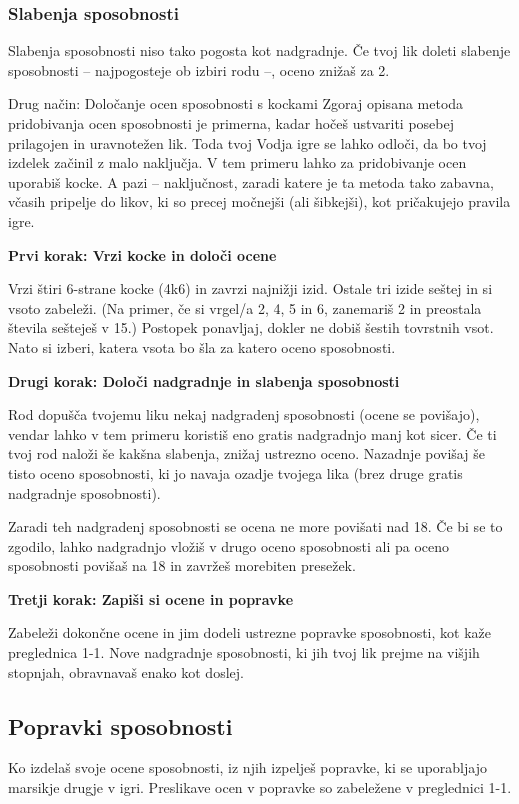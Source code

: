 \subsubsection{Slabenja sposobnosti}
Slabenja sposobnosti niso tako pogosta kot nadgradnje. Če tvoj lik doleti slabenje sposobnosti -- najpogosteje ob izbiri rodu --, oceno znižaš za 2.

\begin{rpg-titlebox}{Drug način: Določanje ocen sposobnosti s kockami}
    Zgoraj opisana metoda pridobivanja ocen sposobnosti je primerna, kadar hočeš ustvariti posebej prilagojen in uravnotežen lik. Toda tvoj Vodja igre se lahko odloči, da bo tvoj izdelek začinil z malo naključja. V tem primeru lahko za pridobivanje ocen uporabiš kocke. A pazi -- naključnost, zaradi katere je ta metoda tako zabavna, včasih pripelje do likov, ki so precej močnejši (ali šibkejši), kot pričakujejo pravila igre.

    \textbf{Prvi korak: Vrzi kocke in določi ocene}

    Vrzi štiri 6-strane kocke (4k6) in zavrzi najnižji izid. Ostale tri izide seštej in si vsoto zabeleži. (Na primer, če si vrgel/a 2, 4, 5 in 6, zanemariš 2 in preostala števila sešteješ v 15.) Postopek ponavljaj, dokler ne dobiš šestih tovrstnih vsot. Nato si izberi, katera vsota bo šla za katero oceno sposobnosti.

    \textbf{Drugi korak: Določi nadgradnje in slabenja sposobnosti}

    Rod dopušča tvojemu liku nekaj nadgradenj sposobnosti (ocene se povišajo), vendar lahko v tem primeru koristiš eno gratis nadgradnjo manj kot sicer. Če ti tvoj rod naloži še kakšna slabenja, znižaj ustrezno oceno. Nazadnje povišaj še tisto oceno sposobnosti, ki jo navaja ozadje tvojega lika (brez druge gratis nadgradnje sposobnosti).

    Zaradi teh nadgradenj sposobnosti se ocena ne more povišati nad 18. Če bi se to zgodilo, lahko nadgradnjo vložiš v drugo oceno sposobnosti ali pa oceno sposobnosti povišaš na 18 in zavržeš morebiten presežek.

    \textbf{Tretji korak: Zapiši si ocene in popravke}

    Zabeleži dokončne ocene in jim dodeli ustrezne popravke sposobnosti, kot kaže preglednica 1-1. Nove nadgradnje sposobnosti, ki jih tvoj lik prejme na višjih stopnjah, obravnavaš enako kot doslej.
\end{rpg-titlebox}

\subsection{Popravki sposobnosti}
Ko izdelaš svoje ocene sposobnosti, iz njih izpelješ popravke, ki se uporabljajo marsikje drugje v igri. Preslikave ocen v popravke so zabeležene v preglednici 1-1.

